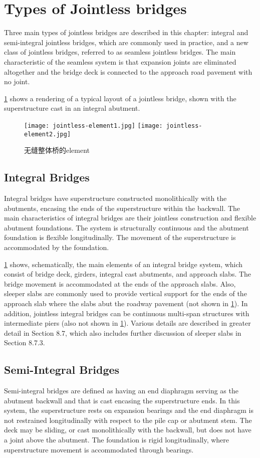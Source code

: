 \section{Types of Jointless bridges}
Three main types of jointless bridges are described in this chapter: integral and semi-integral jointless bridges,
which are commonly used in practice, and a new class of jointless bridges, referred to as seamless jointless bridges.
The main characteristic of the seamless system is that expansion joints are eliminated altogether and the bridge deck is
connected to the approach road pavement with no joint.

\cref{fig:jointless-element} shows a rendering of a typical layout of a jointless bridge, shown with the superstructure cast in an integral abutment.

\begin{figure}
  \texttt{[image: jointless-element1.jpg]}
  \texttt{[image: jointless-element2.jpg]}
  \caption{无缝整体桥的\gls*{element}}
  \label{fig:jointless-element}
\end{figure}

\subsection{Integral Bridges}
Integral bridges have superstructure constructed monolithically with the abutments, encasing the ends of the
superstructure within the backwall. The main characteristics of integral bridges are their jointless construction and
flexible abutment foundations. The system is structurally continuous and the abutment foundation is flexible
longitudinally. The movement of the superstructure is accommodated by the foundation.

\cref{fig:jointless-element} shows, schematically, the main elements of an integral bridge system, which consist of bridge deck,
girders, integral cast abutments, and approach slabs. The bridge movement is accommodated at the ends of the
approach slabs. Also, sleeper slabs are commonly used to provide vertical support for the ends of the approach slab
where the slabs abut the roadway pavement (not shown in \cref{fig:jointless-element}). In addition, jointless integral bridges can be
continuous multi-span structures with intermediate piers (also not shown in \cref{fig:jointless-element}). Various details are described
in greater detail in Section 8.7, which also includes further discussion of sleeper slabs in Section 8.7.3.

\subsection{Semi-Integral Bridges}
Semi-integral bridges are defined as having an end diaphragm serving as the abutment backwall and that is cast encasing the superstructure ends. In this system, the superstructure rests on expansion bearings and the end diaphragm is not restrained longitudinally with respect to the pile cap or abutment stem. The deck may be sliding, or cast monolithically with the backwall, but does not have a joint above the abutment. The foundation is rigid longitudinally,
where superstructure movement is accommodated through bearings.


